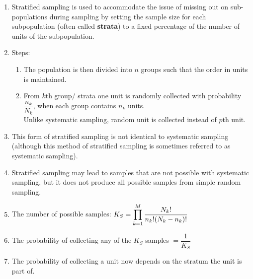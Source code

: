 \begin{enumerate}[itemsep=0.3cm]
    \item Stratified sampling is used to accommodate the issue of missing out on sub-populations during sampling by setting the sample size for each subpopulation (often called \textbf{strata}\label{Sampling Plans/Representative Sampling/Stratified Sampling/strata}) to a fixed percentage of the number of units of the subpopulation.
    \hfill \cite{statistics/book/Statistics-for-Data-Scientists/Maurits-Kaptein}

    \item Steps:
    \hfill \cite{statistics/book/Statistics-for-Data-Scientists/Maurits-Kaptein}
    \begin{enumerate}
        \item The population is then divided into $n$ groups such that the order in units is maintained.

        \item From $k$th group/ strata one unit is randomly collected with probability $\dfrac{n_k}{N_k}$, when each group contains $n_k$ units.\\
        Unlike systematic sampling, random unit is collected instead of $p$th unit.
    \end{enumerate}

    \item This form of stratified sampling is not identical to systematic sampling (although this method of stratified sampling is sometimes referred to as systematic sampling).
    \hfill \cite{statistics/book/Statistics-for-Data-Scientists/Maurits-Kaptein}

    \item Stratified sampling may lead to samples that are not possible with systematic sampling, but it does not produce all possible samples from simple random sampling.
    \hfill \cite{statistics/book/Statistics-for-Data-Scientists/Maurits-Kaptein}

    \item The number of possible samples: $
        K_S
        = \displaystyle\prod_{k=1}^{M} \dfrac{N_k!}{n_k!(N_k-n_k)!}
    $ 
    \hfill \cite{statistics/book/Statistics-for-Data-Scientists/Maurits-Kaptein}

    \item The probability of collecting any of the $K_S$ samples $
        = \dfrac{1}{K_S}
    $
    \hfill \cite{statistics/book/Statistics-for-Data-Scientists/Maurits-Kaptein}

    \item The probability of collecting a unit now depends on the stratum the unit is part of.
    \hfill \cite{statistics/book/Statistics-for-Data-Scientists/Maurits-Kaptein}


\end{enumerate}

